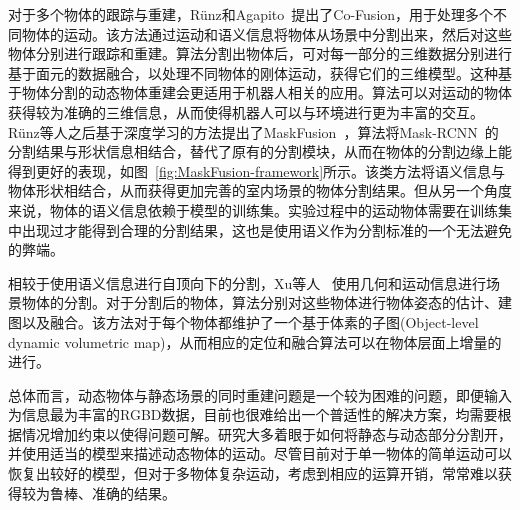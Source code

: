 对于多个物体的跟踪与重建，R\"unz和Agapito~\cite{2017CoFusion}提出了Co-Fusion，用于处理多个不同物体的运动。该方法通过运动和语义信息将物体从场景中分割出来，然后对这些物体分别进行跟踪和重建。算法分割出物体后，可对每一部分的三维数据分别进行基于面元的数据融合，以处理不同物体的刚体运动，获得它们的三维模型。这种基于物体分割的动态物体重建会更适用于机器人相关的应用。算法可以对运动的物体获得较为准确的三维信息，从而使得机器人可以与环境进行更为丰富的交互。R\"unz等人之后基于深度学习的方法提出了MaskFusion~\cite{2018MaskFusion}，算法将Mask-RCNN~\cite{2017MaskRCNN}的分割结果与形状信息相结合，替代了原有的分割模块，从而在物体的分割边缘上能得到更好的表现，如图~\ref{fig:MaskFusion-framework}所示。该类方法将语义信息与物体形状相结合，从而获得更加完善的室内场景的物体分割结果。但从另一个角度来说，物体的语义信息依赖于模型的训练集。实验过程中的运动物体需要在训练集中出现过才能得到合理的分割结果，这也是使用语义作为分割标准的一个无法避免的弊端。

相较于使用语义信息进行自顶向下的分割，Xu等人 ~\cite{2019MIDFusion}使用几何和运动信息进行场景物体的分割。对于分割后的物体，算法分别对这些物体进行物体姿态的估计、建图以及融合。该方法对于每个物体都维护了一个基于体素的子图(Object-level dynamic volumetric map)，从而相应的定位和融合算法可以在物体层面上增量的进行。

总体而言，动态物体与静态场景的同时重建问题是一个较为困难的问题，即便输入为信息最为丰富的RGBD数据，目前也很难给出一个普适性的解决方案，均需要根据情况增加约束以使得问题可解。研究大多着眼于如何将静态与动态部分分割开，并使用适当的模型来描述动态物体的运动。尽管目前对于单一物体的简单运动可以恢复出较好的模型，但对于多物体复杂运动，考虑到相应的运算开销，常常难以获得较为鲁棒、准确的结果。
